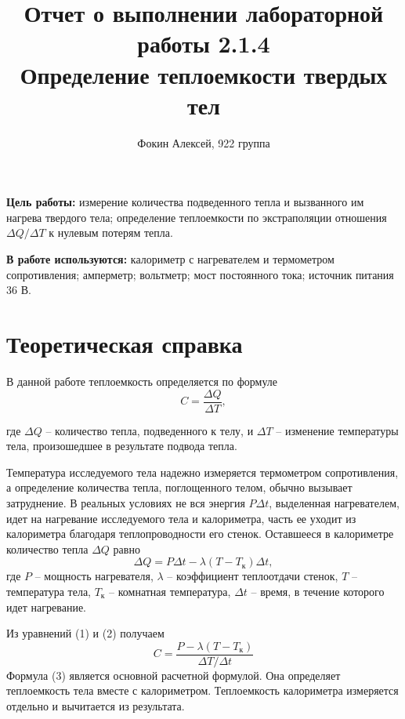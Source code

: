 \documentclass[12pt,a4paper]{article}
\title{
Отчет о выполнении лабораторной работы 2.1.4 \\
Определение теплоемкости твердых тел
}
\author{Фокин Алексей, 922 группа}
\begin{document}
\maketitle

	\textbf{Цель работы:} измерение количества подведенного тепла и вызванного им нагрева твердого тела; определение теплоемкости по экстраполяции отношения $\Delta Q / \Delta T$ к нулевым потерям тепла.
	
	\textbf{В работе используются:} калориметр с нагревателем и термометром сопротивления; амперметр; вольтметр; мост постоянного тока; источник питания 36 В.

\section{Теоретическая справка}

В данной работе теплоемкость определяется по формуле
\begin{equation}
	C = \frac{\Delta Q}{\Delta T},
	\label{eq:dQdT}
\end{equation}

где $\Delta Q$ -- количество тепла, подведенного к телу, и $\Delta T$ -- изменение температуры тела, произошедшее в результате подвода тепла.

Температура исследуемого тела надежно измеряется термометром сопротивления, а определение количества тепла, поглощенного телом, обычно вызывает затруднение. В реальных условиях не вся энергия $P \Delta t$, выделенная нагревателем, идет на нагревание исследуемого тела и калориметра, часть ее уходит из калориметра благодаря теплопроводности его стенок. Оставшееся в калориметре количество тепла $\Delta Q$ равно 
\begin{equation}
	\Delta Q = P\Delta t - \lambda(T - T_{\text{к}}) \Delta t,
	\label{eq:dQ}
\end{equation}
где $P$ -- мощность нагревателя, $\lambda$ -- коэффициент теплоотдачи стенок, $T$ -- температура тела, $T_{\text{к}}$ -- комнатная температура, $ \Delta t$ -- время, в течение которого идет нагревание.

Из уравнений (1) и (2) получаем
\begin{equation}
    C = \frac{P - \lambda(T - T_{\text{к}})}{\Delta T / \Delta t}
    \label{osnovnaya}
\end{equation}
Формула (3) является основной расчетной формулой. Она определяет теплоемкость тела вместе с калориметром. Теплоемкость калориметра измеряется отдельно и вычитается из результата.
\end{document}
